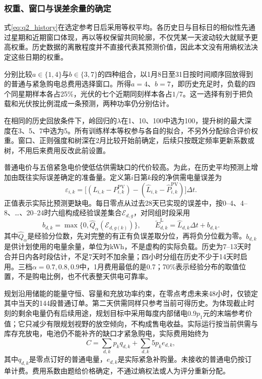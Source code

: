 \subsubsection{权重、窗口与误差余量的确定}

式\eqref{eq:q2_history}在选定参考日后采用等权平均。各历史日与目标日的相似性先通过星期和近期窗口体现，再以等权保留共同轮廓，不仅凭某一天波动较大就赋予更高权重。历史数据的离散程度并不直接代表其预测价值，因此本文没有用熵权法决定这些日期的权重。

分别比较$a\in\{1,4\}$与$b\in\{3,7\}$的四种组合，以1月8日至31日按时间顺序回放得到的普通与紧急购电总费用选择窗口。所得$a=4$、$b=7$，即历史充足时，负载的四个同星期样本各占25\%，光伏的七个近期同刻样本各占$1/7$。这一选择有别于把负载和光伏按比例混成一条预测，两种功率仍分别估计。

在相同的历史回放条件下，岭回归的$\lambda$在1、10、100中选为100，提升树的最大深度在3、5、7中选为5。所有训练样本等权参与各自的拟合，不另外分配综合评价权重。窗口、正则强度和树深在2月比较开始前确定，后续只按既定频率更新系数或树，不用后来费用反改此前设置。

普通电价与五倍紧急电价使低估供需缺口的代价较高。为此，在历史平均预测上增加由既往实际误差确定的准备量。定义第$i$日第$k$段的净供需电量误差为
\begin{equation}
 \varepsilon_{i,k}=\big[(L_{i,k}-P^{\mathrm{PV}}_{i,k})
 -(\widehat L_{i,k}-\widehat P^{\mathrm{PV}}_{i,k})\big]\Delta t.
 \label{eq:q2_error}
\end{equation}
正值表示实际比预测更缺电。每日零点从过去28天已实现的误差中，按0--4、4--8、\ldots、20--24时六组构成经验误差集合$\mathcal E_{d,g}$，对同组时段采用
\begin{equation}
 b_{d,k}=\max\{0,\widehat Q_{\alpha}(\mathcal E_{d,g(k)})\},\qquad
 \widetilde E^{\mathrm L}_{d,k}=\widehat L_{d,k}\Delta t+b_{d,k}.
 \label{eq:q2_allowance}
\end{equation}
其中$\widehat Q_\alpha$是经验分位数，先对完整的有正有负误差取分位，再将负分位截为零。$b_{d,k}$是供计划使用的电量余量，单位为kWh，不是虚构的实际负载。历史为7--13天时合并日内各时段估计，不足7天时不加余量；四小时分组在历史不少于14天时启用。三档$\alpha=0.7,0.8,0.9$中，1月费用最低的是0.7；70\%表示经验分布的取值位置，不是购电比例，也不代表整天供电可靠率。

规划沿用储能的能量守恒、容量和充放功率约束，在零点考虑未来48小时，仅锁定其中当天的144段普通订单。第二天供需同样只参考当前可得历史。为体现截止时刻的剩余电量仍有后续用途，规划目标中采用每度内部储电$0.9p_1$元的末端参考价值；它只减少有限规划视野的放空倾向，不构成售电收益。实际运行按当前供需与库存充放电，电池仍不能补齐的缺口才紧急购电，实际费用始终为
\begin{equation}
 C=\sum_{d,k}p_kq_{d,k}+\sum_{d,k}5p_ke_{d,k},
 \label{eq:q2_actual_bill}
\end{equation}
其中$q_{d,k}$是零点订好的普通电量，$e_{d,k}$是实际紧急补购量。未接收的普通电仍按订单计费。费用系数由题给价格确定，不通过熵权法或人为评分重新分配。

